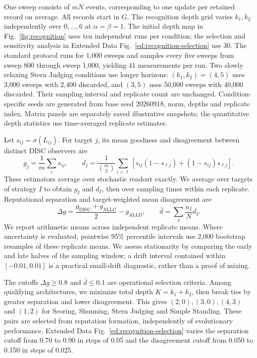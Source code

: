 \documentclass[fleqn,10pt]{article}
\begin{document}
One sweep consists of $mN$ events, corresponding to one update per retained record on average. All records start in $G$. The recognition depth grid varies $k_1,k_2$ independently over $0,\ldots,6$ at $\alpha=\beta=1$. The initial depth map in Fig.~\ref{fig:recognition} uses ten independent runs per condition; the selection and sensitivity analysis in Extended Data Fig.~\ref{ed:recognition-selection} use 30. The standard protocol runs for 1,000 sweeps and samples every five sweeps from sweep 800 through sweep 1,000, yielding 41 measurements per run. Two slowly relaxing Stern Judging conditions use longer horizons: $(k_1,k_2)=(4,5)$ uses 3,000 sweeps with 2,400 discarded, and $(3,5)$ uses 50,000 sweeps with 40,000 discarded. Their sampling interval and replicate count are unchanged. Condition-specific seeds are generated from base seed 20260918, norm, depths and replicate index. Matrix panels are separately saved illustrative snapshots; the quantitative depth statistics use time-averaged replicate estimates.

Let $s_{ij}=\sigma(L_{ij})$. For target $j$, its mean goodness and disagreement between distinct DISC observers are
\begin{equation}
g_j=\frac{1}{m}\sum_i s_{ij},\qquad
d_j=\frac{1}{\binom m2}\sum_{i<\ell}
\left[s_{ij}(1-s_{\ell j})+(1-s_{ij})s_{\ell j}\right].
\label{eq:methods-finite-estimators}
\end{equation}
These estimators average over stochastic readout exactly. We average over targets of strategy $I$ to obtain $g_I$ and $d_I$, then over sampling times within each replicate. Reputational separation and target-weighted mean disagreement are
\begin{equation}
\Delta g=\frac{g_{\mathrm{DISC}}+g_{\mathrm{ALLC}}}{2}-g_{\mathrm{ALLD}},
\qquad \bar d=\sum_I\frac{n_I}{N}d_I.
\label{eq:methods-recognition-statistics}
\end{equation}
We report arithmetic means across independent replicate means. Where uncertainty is evaluated, pointwise 95\% percentile intervals use 2,000 bootstrap resamples of these replicate means. We assess stationarity by comparing the early and late halves of the sampling window; a drift interval contained within $[-0.01,0.01]$ is a practical small-drift diagnostic, rather than a proof of mixing.

The cutoffs $\Delta g\geq0.8$ and $\bar d\leq0.1$ are operational selection criteria. Among qualifying architectures, we minimize total depth $K=k_1+k_2$, then break ties by greater separation and lower disagreement. This gives $(2,0),(3,0),(4,3)$ and $(1,2)$ for Scoring, Shunning, Stern Judging and Simple Standing. These pairs are selected from reputation formation, independently of evolutionary performance. Extended Data Fig.~\ref{ed:recognition-selection} varies the separation cutoff from 0.70 to 0.90 in steps of 0.05 and the disagreement cutoff from 0.050 to 0.150 in steps of 0.025.
\end{document}
